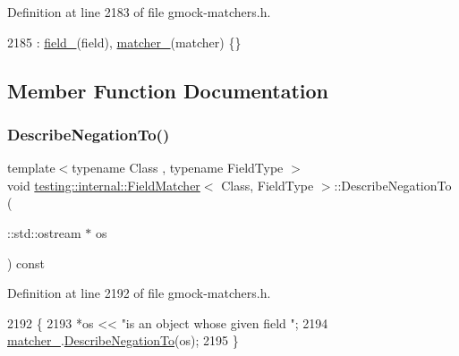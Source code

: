 Definition at line 2183 of file gmock-\/matchers.\+h.


\begin{DoxyCode}
2185       : \hyperlink{classtesting_1_1internal_1_1FieldMatcher_a5937d084f46df4f81948c33688408d31}{field\_}(field), \hyperlink{classtesting_1_1internal_1_1FieldMatcher_a14eca9e5ca69aabaa9fe288effb1f57c}{matcher\_}(matcher) \{\}
\end{DoxyCode}


\subsection{Member Function Documentation}
\mbox{\label{classtesting_1_1internal_1_1FieldMatcher_a3d8eb433d6a765f8d59b3b07704c3d80}} 
\subsubsection{\texorpdfstring{Describe\+Negation\+To()}{DescribeNegationTo()}}
{\footnotesize\ttfamily template$<$typename Class , typename Field\+Type $>$ \\
void \hyperlink{classtesting_1_1internal_1_1FieldMatcher}{testing\+::internal\+::\+Field\+Matcher}$<$ Class, Field\+Type $>$\+::Describe\+Negation\+To (\begin{DoxyParamCaption}\item[{\+::std\+::ostream $\ast$}]{os }\end{DoxyParamCaption}) const\hspace{0.3cm}{\ttfamily [inline]}}



Definition at line 2192 of file gmock-\/matchers.\+h.


\begin{DoxyCode}
2192                                                 \{
2193     *os << \textcolor{stringliteral}{"is an object whose given field "};
2194     \hyperlink{classtesting_1_1internal_1_1FieldMatcher_a14eca9e5ca69aabaa9fe288effb1f57c}{matcher\_}.\hyperlink{classtesting_1_1internal_1_1MatcherBase_ac1089d49b6b8a381900618985cd69b7f}{DescribeNegationTo}(os);
2195   \}
\end{DoxyCode}
\mbox{\label{classtesting_1_1internal_1_1FieldMatcher_af0726e67962870bed9f3b184b3edb22e}} 
